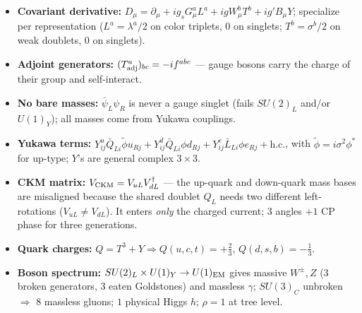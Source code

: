 \begin{itemize}
  \item \textbf{Covariant derivative:}
        $D_\mu = \partial_\mu + ig_s G^a_\mu L^a + ig W^b_\mu T^b
        + ig' B_\mu Y$; specialize per representation
        ($L^a=\lambda^a/2$ on color triplets, $0$ on singlets;
        $T^b=\sigma^b/2$ on weak doublets, $0$ on singlets).
  \item \textbf{Adjoint generators:} $(T^a_{\rm adj})_{bc}=-if^{abc}$ ---
        gauge bosons carry the charge of their group and self-interact.
  \item \textbf{No bare masses:} $\bar\psi_L\psi_R$ is never a gauge
        singlet (fails $SU(2)_L$ and/or $U(1)_Y$); all masses come from
        Yukawa couplings.
  \item \textbf{Yukawa terms:}
        $Y^u_{ij}\bar Q_{Li}\tilde\phi u_{Rj}
        + Y^d_{ij}\bar Q_{Li}\phi d_{Rj}
        + Y^e_{ij}\bar L_{Li}\phi e_{Rj} + \text{h.c.}$,
        with $\tilde\phi=i\sigma^2\phi^*$ for up-type; $Y$'s are general
        complex $3\times3$.
  \item \textbf{CKM matrix:} $V_{\rm CKM}=V_{uL}V_{dL}^\dagger$ --- the
        up-quark and down-quark mass bases are misaligned because the
        shared doublet $Q_L$ needs two different left-rotations
        ($V_{uL}\neq V_{dL}$). It enters \emph{only} the charged current;
        $3$ angles $+1$ CP phase for three generations.
  \item \textbf{Quark charges:} $Q=T^3+Y\Rightarrow Q(u,c,t)=+\tfrac23$,
        $Q(d,s,b)=-\tfrac13$.
  \item \textbf{Boson spectrum:} $SU(2)_L\times U(1)_Y\to U(1)_{\rm EM}$
        gives massive $W^\pm,Z$ (3 broken generators, 3 eaten
        Goldstones) and massless $\gamma$; $SU(3)_C$ unbroken $\Rightarrow$
        $8$ massless gluons; $1$ physical Higgs $h$; $\rho=1$ at tree
        level.
\end{itemize}

